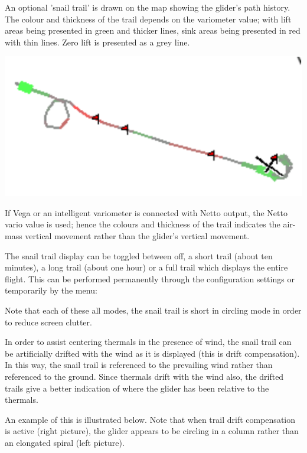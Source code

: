 \documentclass[a4paper,12pt]{refrep}
\begin{document}
An optional 'snail trail' is drawn on the map showing the glider's
path history.  The colour and thickness of the trail depends on the
variometer value; with lift areas being presented in green and thicker
lines, sink areas being presented in red with thin lines.  Zero lift
is presented as a grey line.

\begin{center}
\includegraphics[angle=0,width=0.8\linewidth,keepaspectratio='true']{figures/snail.pdf}
\end{center}

If Vega or an intelligent variometer is connected with Netto output,
the Netto vario value is used; hence the colours and thickness of the
trail indicates the air-mass vertical movement rather than the glider's
vertical movement.

The snail trail display can be toggled between off, a short trail
(about ten minutes), a long trail (about one hour) or a full trail
which displays the entire flight.  This can be performed permanently
through the configuration settings or temporarily by the menu:
\begin{quote}
\blink{}
\end{quote}

Note that each of these all modes, the snail trail is short in
circling mode in order to reduce screen clutter.

In order to assist centering thermals in the presence of wind, the
snail trail can be artificially drifted with the wind as it is
displayed (this is drift compensation).  In this way, the snail trail
is referenced to the prevailing wind rather than referenced to the
ground.  Since thermals drift with the wind also, the drifted trails
give a better indication of where the glider has been relative to the
thermals.

An example of this is illustrated below.  Note that when trail drift
compensation is active (right picture), the glider appears to be
circling in a column rather than an elongated spiral (left picture).
\end{document}
